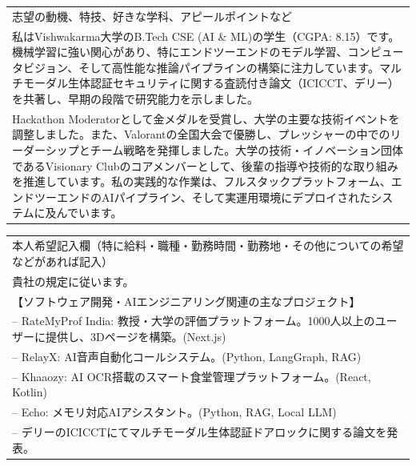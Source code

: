 \documentclass[9pt,a4paper]{article}
\begin{document}
\noindent
\begin{tabularx}{\textwidth}{|X|}
\hline
\rule{0pt}{12pt}志望の動機、特技、好きな学科、アピールポイントなど \\[2mm]
私はVishwakarma大学のB.Tech CSE (AI \& ML)の学生（CGPA: 8.15）です。機械学習に強い関心があり、特にエンドツーエンドのモデル学習、コンピュータビジョン、そして高性能な推論パイプラインの構築に注力しています。マルチモーダル生体認証セキュリティに関する査読付き論文（ICICCT、デリー）を共著し、早期の段階で研究能力を示しました。\\[2mm]
Hackathon Moderatorとして金メダルを受賞し、大学の主要な技術イベントを調整しました。また、Valorantの全国大会で優勝し、プレッシャーの中でのリーダーシップとチーム戦略を発揮しました。大学の技術・イノベーション団体であるVisionary Clubのコアメンバーとして、後輩の指導や技術的な取り組みを推進しています。私の実践的な作業は、フルスタックプラットフォーム、エンドツーエンドのAIパイプライン、そして実運用環境にデプロイされたシステムに及んでいます。
\\[2mm] \hline
\end{tabularx}
\vspace{4mm}

\noindent
\begin{tabularx}{\textwidth}{|X|}
\hline
\rule{0pt}{12pt}本人希望記入欄（特に給料・職種・勤務時間・勤務地・その他についての希望などがあれば記入） \\[2mm]
貴社の規定に従います。\\[2mm]
【ソフトウェア開発・AIエンジニアリング関連の主なプロジェクト】\\
-- RateMyProf India: 教授・大学の評価プラットフォーム。1000人以上のユーザーに提供し、3Dページを構築。(Next.js)\\
-- RelayX: AI音声自動化コールシステム。(Python, LangGraph, RAG)\\
-- Khaaozy: AI OCR搭載のスマート食堂管理プラットフォーム。(React, Kotlin)\\
-- Echo: メモリ対応AIアシスタント。(Python, RAG, Local LLM)\\
-- デリーのICICCTにてマルチモーダル生体認証ドアロックに関する論文を発表。
\\[2mm] \hline
\end{tabularx}
\end{document}
